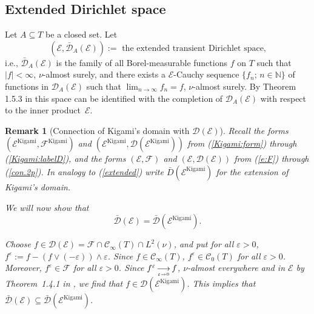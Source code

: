 \documentclass[11pt]{amsart}
\numberwithin{equation}{section}
\newtheorem{remark}[definition]{Remark}
\begin{document}
{\subsection{Extended Dirichlet space}
\label{Sub:extended}
Let $A\subseteq T$ be a closed set. Let
\begin{equation}
\label{extended}
   (\mathcal E,\bar{\mathcal D}_A(\mathcal E))
  :=
    \mbox{ the extended transient Dirichlet space,}
\end{equation}
i.e., $\bar{\mathcal D}_A(\mathcal E)$ is the family of all Borel-measurable functions $f$ on $T$ such that $|f|<\infty$, $\nu$-almost surely, and there exists a ${\mathcal E}$-Cauchy sequence $\{f_n;\,n\in{{\mathbb N}}\}$ of functions in $\mathcal D_A(\mathcal E)$ such that $\lim_{n\to\infty}f_n=f$, $\nu$-almost surely. By
Theorem 1.5.3 in \cite{FukushimaOshimaTakeda1994} this space can be
identified with the completion of $\mathcal D_A(\mathcal E)$ with
respect to the inner product~$\mathcal E$.{\smallskip}

{\begin{remark}[Connection of Kigami's domain with ${\mathcal D}({\mathcal E})$] \rm
{Recall the forms  $({\mathcal E}^{\mathrm{Kigami}},{\mathcal F}^{\mathrm{Kigami}})$ and $({\mathcal E}^{\mathrm{Kigami}},{\mathcal D}({\mathcal E}^{\mathrm{Kigami}}))$
from (\ref{Kigami:form}) through (\ref{Kigami:labelD}), and the forms  $({\mathcal E},{\mathcal F})$ and $({\mathcal E},{\mathcal D}({\mathcal E}))$
from (\ref{e:F}) through (\ref{con.2p}).
In analogy to (\ref{extended}) write $\bar{D}({\mathcal E}^{\mathrm{Kigami}})$ for the extension of Kigami's domain.

We will now show that
\begin{equation}
\label{e:028}
\bar{{\mathcal D}}({\mathcal E})=\bar{\mathcal D}({\mathcal E}^{\mathrm{Kigami}}).
\end{equation}}

Choose $f\in{\mathcal D}({\mathcal E})={\mathcal F}\cap{\mathcal C}_\infty(T)\cap L^2(\nu)$,
 and put for all  $\varepsilon>0$, $f^\varepsilon:=f-(f\vee(-\varepsilon))\wedge\varepsilon$. Since $f\in{\mathcal C}_\infty(T)$, $f^\varepsilon\in{\mathcal C}_0(T)$
 for all $\varepsilon>0$.
Moreover, $f^\varepsilon\in{\mathcal F}$ for all $\varepsilon>0$.
Since $f^\varepsilon{{_{\displaystyle\longrightarrow\atop \varepsilon\to 0}}} f$, $\nu$-almost everywhere and in ${\mathcal E}$ by Theorem~1.4.1 in \cite{FukushimaOshimaTakeda1994}, we find that
$f\in{\mathcal D}({\mathcal E}^{\mathrm{Kigami}})$. This implies that $\bar{{\mathcal D}}({\mathcal E})\subseteq\bar{{\mathcal D}}({\mathcal E}^{\mathrm{Kigami}})$.{\smallskip}


\end{remark}}}
\end{document}
